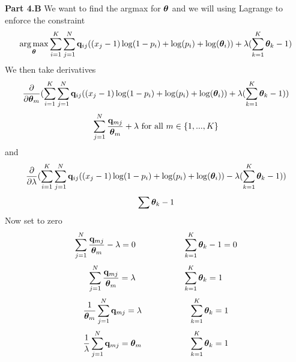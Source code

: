 \documentclass[submit]{harvardml}
\begin{document}
\begin{enumerate}
        
        \textbf{Part 4.B }\newline
        We want to find the argmax for $\boldsymbol{\theta}$ and we will using Lagrange to enforce the constraint
        \begin{equation*}
            \underset{\boldsymbol{\theta}}{\arg\max} \sum_{i=1}^K\sum_{j=1}^N \mathbf{q}_{ij} ((x_j -1) \log(1 - p_i) + \log(p_i) + \log(\boldsymbol{\theta}_{i})) + \lambda (\sum_{k = 1}^K \boldsymbol{\theta}_{k} - 1)
        \end{equation*}
        We then take derivatives
        \begin{equation*}
            \frac{\partial}{\partial\boldsymbol{\theta}_m}(\sum_{i=1}^K\sum_{j=1}^N \mathbf{q}_{ij} ((x_j -1) \log(1 - p_i) + \log(p_i) + \log(\boldsymbol{\theta}_{i})) + \lambda (\sum_{k = 1}^K \boldsymbol{\theta}_{k} - 1))
        \end{equation*}
        \begin{equation*}
            \sum_{j=1}^N \frac{\mathbf{q}_{mj}}{\boldsymbol{\theta}_{m}} + \lambda \text{  for all  } m \in \{1, ..., K\}
        \end{equation*}
        and
        \begin{equation*}
            \frac{\partial}{\partial\lambda}(\sum_{i=1}^K\sum_{j=1}^N \mathbf{q}_{ij} ((x_j -1) \log(1 - p_i) + \log(p_i) + \log(\boldsymbol{\theta}_{i})) - \lambda (\sum_{k = 1}^K \boldsymbol{\theta}_{k} - 1))
        \end{equation*}
        \begin{equation*}
            \sum \boldsymbol{\theta}_{k} - 1
        \end{equation*}
        Now set to zero
        \begin{equation*}
            \sum_{j=1}^N \frac{\mathbf{q}_{mj}}{\boldsymbol{\theta}_{m}} - \lambda = 0 \hspace{2cm} \sum_{k = 1}^K \boldsymbol{\theta}_{k} - 1 = 0
        \end{equation*}
        \begin{equation*}
            \sum_{j=1}^N \frac{\mathbf{q}_{mj}}{\boldsymbol{\theta}_{m}} = \lambda \hspace{2cm} \sum_{k = 1}^K \boldsymbol{\theta}_{k} = 1
        \end{equation*}
        \begin{equation*}
            \frac{1}{\boldsymbol{\theta}_{m}} \sum_{j=1}^N \mathbf{q}_{mj} = \lambda \hspace{2cm} \sum_{k = 1}^K \boldsymbol{\theta}_{k} = 1
        \end{equation*}
        \begin{equation*}
            \frac{1}{\lambda} \sum_{j=1}^N \boldq_{mj} = \btheta_{m} \hspace{2cm} \sum_{k = 1}^K \btheta_{k} = 1

\end{equation*}
\end{enumerate}
\end{document}
